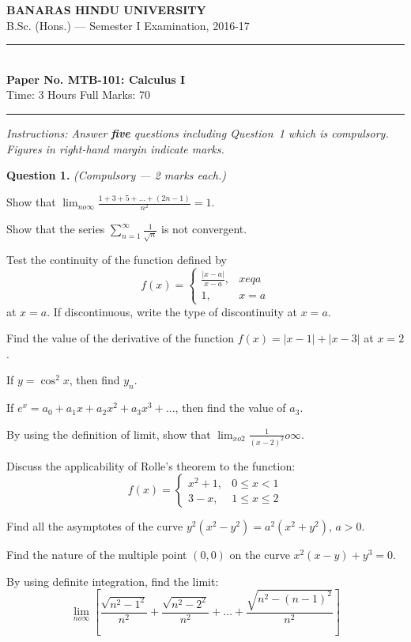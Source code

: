 \documentclass[11pt,a4paper]{article}
\begin{document}
\begin{center}
  {\large\bfseries BANARAS HINDU UNIVERSITY}\\[2pt]
  {\normalsize B.Sc. (Hons.) --- Semester I Examination, 2016-17}\\[6pt]
  \rule{0.8\linewidth}{0.5pt}\\[6pt]
  {\large\bfseries Paper No. MTB-101: Calculus I}\\[4pt]
  {\normalsize Time: 3 Hours \hfill Full Marks: 70}
\end{center}
\rule{\linewidth}{0.4pt}
\smallskip



\noindent   \textit{Instructions: Answer   \textbf{five} questions including Question~1 which is compulsory. Figures in right-hand margin indicate marks.}
\bigskip




\noindent   \textbf{Question 1.}   \textit{(Compulsory --- 2 marks each.)}

\begin{parts}
  \item Show that $\lim_{n  o \infty} \frac{1 + 3 + 5 + \dots + (2n-1)}{n^2} = 1$.
  \item Show that the series $\sum_{n=1}^\infty \frac{1}{\sqrt{n}}$ is not convergent.
  \item Test the continuity of the function defined by
  \[
  f(x) = 
\begin{cases} \frac{|x-a|}{x-a}, & x 
eq a \\ 1, & x = a \end{cases}
  \]
  at $x = a$. If discontinuous, write the type of discontinuity at $x = a$.
  \item Find the value of the derivative of the function $f(x) = |x-1| + |x-3|$ at $x=2$.
  \item If $y = \cos^2 x$, then find $y_n$.
  \item If $e^x = a_0 + a_1 x + a_2 x^2 + a_3 x^3 + \dots$, then find the value of $a_3$.
  \item By using the definition of limit, show that $\lim_{x o 2} \frac{1}{(x-2)^2}  o \infty$.
  \item Discuss the applicability of Rolle's theorem to the function:
  \[
  f(x) = 
\begin{cases} x^2+1, & 0 \le x < 1 \\ 3-x, & 1 \le x \le 2 \end{cases}
  \]
  \item Find all the asymptotes of the curve $y^2(x^2 - y^2) = a^2(x^2 + y^2)$, $a > 0$.
  \item Find the nature of the multiple point $(0, 0)$ on the curve $x^2(x-y) + y^3 = 0$.
  \item By using definite integration, find the limit:
  \[
  \lim_{n o\infty} \left[ \frac{\sqrt{n^2-1^2}}{n^2} + \frac{\sqrt{n^2-2^2}}{n^2} + \dots + \frac{\sqrt{n^2-(n-1)^2}}{n^2} \right]
  \]
\end{parts}
\end{document}

